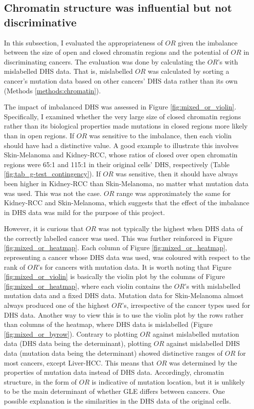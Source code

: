 \subsection{Chromatin structure was influential but not discriminative}\label{gle:mixed_or}

In this subsection, I evaluated the appropriateness of $OR$ given the imbalance between the size of open and closed chromatin regions and the potential of $OR$ in discriminating cancers. The evaluation was done by calculating the $OR$'s with mislabelled DHS data. That is, mislabelled $OR$ was calculated by sorting a cancer's mutation data based on other cancers' DHS data rather than its own (Methods \ref{methods:chromatin}). 

The impact of imbalanced DHS was assessed in Figure \ref{fig:mixed_or_violin}. Specifically, I examined whether the very large size of closed chromatin regions rather than its biological properties made mutations in closed regions more likely than in open regions. If $OR$ was sensitive to the imbalance, then each violin should have had a distinctive value. A good example to illustrate this involves Skin-Melanoma and Kidney-RCC, whose ratios of closed over open chromatin regions were 65:1 and 115:1 in their original cells' DHS, respectively (Table \ref{fig:tab_g-test_contingency}). If $OR$ was sensitive, then it should have always been higher in Kidney-RCC than Skin-Melanoma, no matter what mutation data was used. This was not the case. $OR$ range was approximately the same for Kidney-RCC and Skin-Melanoma, which suggests that the effect of the imbalance in DHS data was mild for the purpose of this project.

However, it is curious that $OR$ was not typically the highest when DHS data of the correctly labelled cancer was used. This was further reinforced in Figure \ref{fig:mixed_or_heatmap}. Each column of Figure \ref{fig:mixed_or_heatmap}, representing a cancer whose DHS data was used, was coloured with respect to the rank of $OR$'s for cancers with mutation data. It is worth noting that Figure \ref{fig:mixed_or_violin} is basically the violin plot by the columns of Figure \ref{fig:mixed_or_heatmap}, where each violin contains the $OR$'s with mislabelled mutation data and a fixed DHS data. Mutation data for Skin-Melanoma almost always produced one of the highest $OR$'s, irrespective of the cancer types used for DHS data. Another way to view this is to use the violin plot by the rows rather than columns of the heatmap, where DHS data is mislabelled (Figure \ref{fig:mixed_or_byrow}). Contrary to plotting $OR$ against mislabelled mutation data (DHS data being the determinant), plotting $OR$ against mislabelled DHS data (mutation data being the determinant) showed distinctive ranges of $OR$ for most cancers, except Liver-HCC. This means that $OR$ was determined by the properties of mutation data instead of DHS data. Accordingly, chromatin structure, in the form of $OR$ is indicative of mutation location, but it is unlikely to be the main determinant of whether GLE differs between cancers. One possible explanation is the similarities in the DHS data of the original cells.

